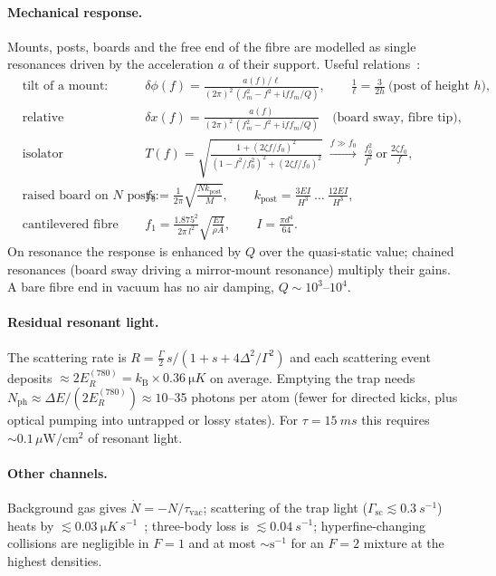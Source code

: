 \documentclass[11pt,a4paper]{article}
\newcommand{\ii}{\mathrm{i}}
\newcommand{\kB}{k_\mathrm{B}}
\begin{document}
\paragraph{Mechanical response.} Mounts, posts, boards and the free end of the fibre are modelled as single resonances driven by the acceleration $a$ of their support. Useful relations~\cite{Timoshenko}:
\begin{align}
&\text{tilt of a mount:} && \delta\phi(f)=\frac{a(f)/\ell}{(2\pi)^2\,(f_m^2-f^2+\ii f f_m/Q)},\qquad \tfrac1\ell=\tfrac{3}{2h}\ \text{(post of height $h$)},\\
&\text{relative displacement:} && \delta x(f)=\frac{a(f)}{(2\pi)^2\,(f_m^2-f^2+\ii f f_m/Q)}\quad\text{(board sway, fibre tip)},\\
&\text{isolator transmissibility:} && T(f)=\sqrt{\frac{1+(2\zeta f/f_0)^2}{(1-f^2/f_0^2)^2+(2\zeta f/f_0)^2}}\;\xrightarrow{f\gg f_0}\;\frac{f_0^2}{f^2}\ \text{or}\ \frac{2\zeta f_0}{f},\\
&\text{raised board on $N$ posts:} && f_b=\frac1{2\pi}\sqrt{\frac{N k_\mathrm{post}}{M}},\qquad k_\mathrm{post}=\frac{3EI}{H^3}\ \ldots\ \frac{12EI}{H^3},\\
&\text{cantilevered fibre end:} && f_1=\frac{1.875^2}{2\pi\,l^2}\sqrt{\frac{EI}{\rho A}},\qquad I=\frac{\pi d^4}{64}.
\end{align}
On resonance the response is enhanced by $Q$ over the quasi-static value; chained resonances (board sway driving a mirror-mount resonance) multiply their gains. A bare fibre end in vacuum has no air damping, $Q\sim10^3$--$10^4$.

\paragraph{Residual resonant light.} The scattering rate is $R=\frac\Gamma2\,s/(1+s+4\Delta^2/\Gamma^2)$ and each scattering event deposits $\approx2E_R^{(780)}=\kB\times\SI{0.36}{\micro K}$ on average. Emptying the trap needs $N_\mathrm{ph}\approx\Delta E/(2E_R^{(780)})\approx10$--35 photons per atom (fewer for directed kicks, plus optical pumping into untrapped or lossy states). For $\tau=\SI{15}{ms}$ this requires $\sim\!0.1\,\mu\mathrm W/\mathrm{cm^2}$ of resonant light.

\paragraph{Other channels.} Background gas gives $\dot N=-N/\tau_\mathrm{vac}$; scattering of the trap light ($\Gamma_\mathrm{sc}\lesssim\SI{0.3}{s^{-1}}$) heats by $\lesssim\SI{0.03}{\micro K\,s^{-1}}$~\cite{Gerbier2010}; three-body loss is $\lesssim\SI{0.04}{s^{-1}}$; hyperfine-changing collisions are negligible in $F=1$ and at most $\sim\mathrm{s^{-1}}$ for an $F=2$ mixture at the highest densities.
\end{document}
